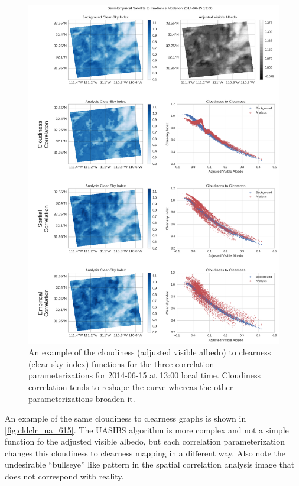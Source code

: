 \begin{figure}[p]
\centering
\includegraphics[width=\textwidth]{figs/cld_to_clear_Semi-Empirical_2014-06-15.png}
\caption[Clearness versus Cloudiness for SE model on 6/15]{An example
  of the cloudiness (adjusted visible albedo) to clearness (clear-sky
  index) functions for the three correlation parameterizations for
  2014-06-15 at 13:00 local time. Cloudiness correlation tends to
  reshape the curve whereas the other parameterizations broaden it.}
\label{fig:cldclr_se_615}
\end{figure}

An example of the same cloudiness to clearness graphs is shown in
\cref{fig:cldclr_ua_615}.
The UASIBS algorithm is more complex and not a simple function
fo the adjusted visible albedo, but each correlation parameterization
changes this cloudiness to clearness mapping in a different way.
Also note the undesirable ``bullseye'' like pattern in the spatial
correlation analysis image that does not correspond with reality.

